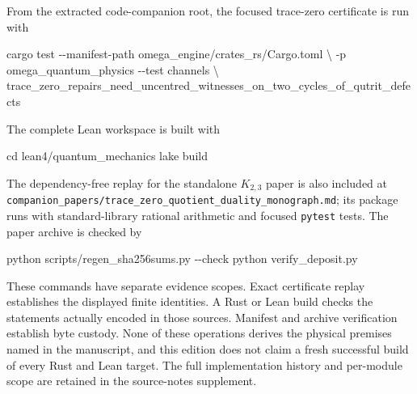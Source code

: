 \documentclass[
  11pt,
]{article}
\newenvironment{Shaded}{}{}
\newcommand{\NormalTok}[1]{#1}
\begin{document}
From the extracted code-companion root, the focused trace-zero
certificate is run with

\begin{Shaded}
\begin{Highlighting}[]
\NormalTok{cargo test {-}{-}manifest{-}path omega\_engine/crates\_rs/Cargo.toml \textbackslash{}}
\NormalTok{  {-}p omega\_quantum\_physics {-}{-}test channels \textbackslash{}}
\NormalTok{  trace\_zero\_repairs\_need\_uncentred\_witnesses\_on\_two\_cycles\_of\_qutrit\_defects}
\end{Highlighting}
\end{Shaded}

The complete Lean workspace is built with

\begin{Shaded}
\begin{Highlighting}[]
\NormalTok{cd lean4/quantum\_mechanics}
\NormalTok{lake build}
\end{Highlighting}
\end{Shaded}

The dependency-free replay for the standalone \(K_{2,3}\) paper is also
included at
\texttt{c\allowbreak{}o\allowbreak{}m\allowbreak{}p\allowbreak{}a\allowbreak{}n\allowbreak{}i\allowbreak{}o\allowbreak{}n\allowbreak{}\_\allowbreak{}p\allowbreak{}a\allowbreak{}p\allowbreak{}e\allowbreak{}r\allowbreak{}s\allowbreak{}/\allowbreak{}t\allowbreak{}r\allowbreak{}a\allowbreak{}c\allowbreak{}e\allowbreak{}\_\allowbreak{}z\allowbreak{}e\allowbreak{}r\allowbreak{}o\allowbreak{}\_\allowbreak{}q\allowbreak{}u\allowbreak{}o\allowbreak{}t\allowbreak{}i\allowbreak{}e\allowbreak{}n\allowbreak{}t\allowbreak{}\_\allowbreak{}d\allowbreak{}u\allowbreak{}a\allowbreak{}l\allowbreak{}i\allowbreak{}t\allowbreak{}y\allowbreak{}\_\allowbreak{}m\allowbreak{}o\allowbreak{}n\allowbreak{}o\allowbreak{}g\allowbreak{}r\allowbreak{}a\allowbreak{}p\allowbreak{}h\allowbreak{}.\allowbreak{}m\allowbreak{}d};
its package runs with standard-library rational arithmetic and focused
\texttt{p\allowbreak{}y\allowbreak{}t\allowbreak{}e\allowbreak{}s\allowbreak{}t}
tests. The paper archive is checked by

\begin{Shaded}
\begin{Highlighting}[]
\NormalTok{python scripts/regen\_sha256sums.py {-}{-}check}
\NormalTok{python verify\_deposit.py}
\end{Highlighting}
\end{Shaded}

These commands have separate evidence scopes. Exact certificate replay
establishes the displayed finite identities. A Rust or Lean build checks
the statements actually encoded in those sources. Manifest and archive
verification establish byte custody. None of these operations derives
the physical premises named in the manuscript, and this edition does not
claim a fresh successful build of every Rust and Lean target. The full
implementation history and per-module scope are retained in the
source-notes supplement.
\end{document}
